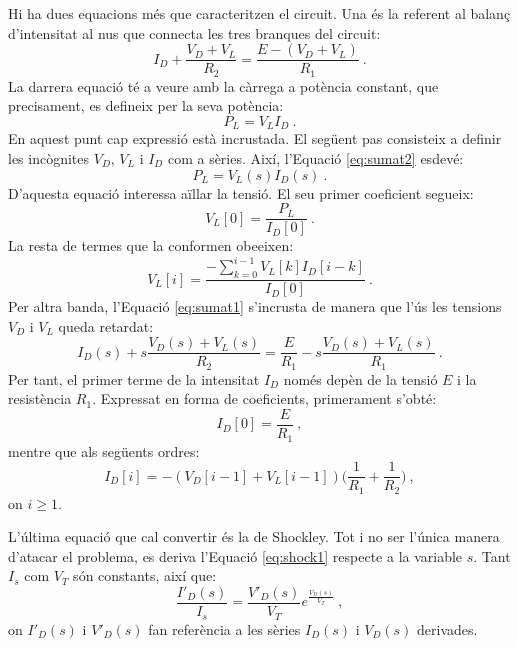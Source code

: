 Hi ha dues equacions més que caracteritzen el circuit. Una és la referent al balanç d'intensitat al nus que connecta les tres branques del circuit:
\begin{equation}
    I_D+\frac{V_D+V_L}{R_2}=\frac{E-(V_D+V_L)}{R_1}\ .
    \label{eq:sumat1}
\end{equation}
La darrera equació té a veure amb la càrrega a potència constant, que precisament, es defineix per la seva potència:
\begin{equation}
    P_L=V_LI_D\ .
    \label{eq:sumat2}
\end{equation}
En aquest punt cap expressió està incrustada. El següent pas consisteix a definir les incògnites $V_D$, $V_L$ i $I_D$ com a sèries. Així, l'Equació \ref{eq:sumat2} esdevé:
\begin{equation}
    P_L=V_L(s)I_D(s)\ .
    \label{eq:pl1}
\end{equation}
D'aquesta equació interessa aïllar la tensió. El seu primer coeficient segueix:
\begin{equation}
    V_L[0]=\frac{P_L}{I_D[0]}\ .
    \label{eq:pl2}
\end{equation}
La resta de termes que la conformen obeeixen:
\begin{equation}
    V_L[i]=\frac{-\sum_{k=0}^{i-1}V_L[k]I_D[i-k]}{I_D[0]}\ .
    \label{eq:pl3}
\end{equation}
Per altra banda, l'Equació \ref{eq:sumat1} s'incrusta de manera que l'ús les tensions $V_D$ i $V_L$ queda retardat:
\begin{equation}
    I_D(s)+s\frac{V_D(s)+V_L(s)}{R_2}=\frac{E}{R_1}-s\frac{V_D(s)+V_L(s)}{R_1}\ .
    \label{eq:sumat4}
\end{equation}
Per tant, el primer terme de la intensitat $I_D$ només depèn de la tensió $E$ i la resistència $R_1$. Expressat en forma de coeficients, primerament s'obté:
\begin{equation}
    I_D[0]=\frac{E}{R_1}\ ,
    \label{eq:sumat5}
\end{equation}
mentre que als següents ordres:
\begin{equation}
    I_D[i]=-(V_D[i-1]+V_L[i-1])\biggl(\frac{1}{R_1}+\frac{1}{R_2}\biggr)\ ,
    \label{eq:sumat6}
\end{equation}
on $i\geq 1$. 

L'última equació que cal convertir és la de Shockley. Tot i no ser l'única manera d'atacar el problema, es deriva l'Equació \ref{eq:shock1} respecte a la variable $s$. Tant $I_s$ com $V_T$ són constants, així que:
\begin{equation}
    \frac{I'_D(s)}{I_s}=\frac{V'_D(s)}{V_T}e^{\frac{V_D(s)}{V_T}}\ ,
    \label{eq:shock2}
\end{equation}
on $I'_D(s)$ i $V'_D(s)$ fan referència a les sèries $I_D(s)$ i $V_D(s)$ derivades. 

